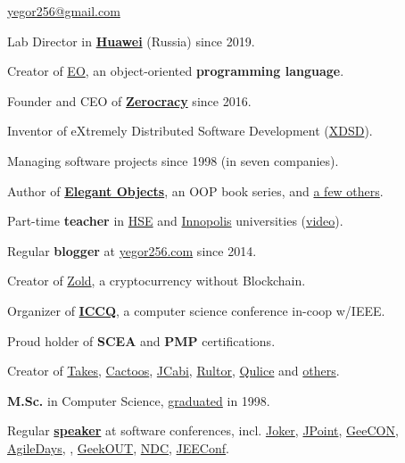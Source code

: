 \documentclass{yb}
\begin{document}
\ybPrintPhoto{}

{\scshape\bfseries\Large {}}\newline
\href{mailto:yegor256@gmail.com}{yegor256@gmail.com}

\vspace{1em}

Lab Director in \textbf{\href{https://www.huawei.com}{Huawei}} (Russia) since 2019.

Creator of \href{https://www.eolang.org}{EO}, an object-oriented \textbf{programming language}.

Founder and CEO of \textbf{\href{https://www.zerocracy.com}{Zerocracy}} since 2016.

Inventor of eXtremely Distributed Software Development (\href{https://www.xdsd.org}{XDSD}).

Managing software projects since 1998 (in seven companies).

Author of \textbf{\href{https://www.yegor256.com/elegant-objects.html}{Elegant Objects}},
  an OOP book series, and \href{https://www.yegor256.com/books.html}{a few others}.

Part-time \textbf{teacher} in \href{https://www.hse.ru/en/}{HSE}
  and \href{https://innopolis.university/en/}{Innopolis} universities
  (\href{https://www.youtube.com/playlist?list=PLaIsQH4uc08y14wCJMeffS2yErN4QpB8m}{video}).

Regular \textbf{blogger} at \href{https://www.yegor256.com/}{yegor256.com} since 2014.

Creator of \href{https://www.zold.io}{Zold}, a cryptocurrency without Blockchain.

Organizer of \href{https://www.iccq.ru}{\textbf{ICCQ}}, a computer science conference in-coop w/IEEE.

Proud holder of \textbf{SCEA} and
  \textbf{PMP} certifications.

Creator of \href{https://www.takes.org}{Takes},
  \href{https://www.cactoos.org}{Cactoos},
  \href{https://www.jcabi.com}{JCabi},
  \href{https://www.rultor.com}{Rultor},
  \href{https://www.qulice.com}{Qulice} and
  \href{https://www.yegor256.com/pets.html}{others}.

\textbf{M.Sc.} in Computer Science,
  \href{https://en.wikipedia.org/wiki/Oles_Honchar_Dnipro_National_University}{graduated} in 1998.

Regular \textbf{\href{https://www.yegor256.com/talks.html}{speaker}}
  at software conferences, incl.
  \href{https://youtu.be/55mwAbuDrV8}{Joker},
  \href{https://www.youtube.com/watch?v=20QBvrHq6TA}{JPoint},
  \href{https://vimeo.com/177215750}{GeeCON},
  \href{https://www.youtube.com/watch?v=TLM9eN0b6zo}{AgileDays},
  \href{https://www.youtube.com/watch?v=03PXmPc7Q3g}{},
  \href{https://www.youtube.com/watch?v=7yTIWFZrXpg}{GeekOUT},
  \href{https://www.youtube.com/watch?v=vU_x6oK437I}{NDC},
  \href{https://www.youtube.com/watch?v=GS45LzE3LPQ}{JEEConf}.
\end{document}
